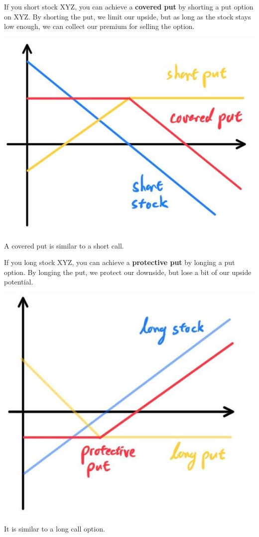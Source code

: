 \documentclass{article}
\begin{document}
\begin{definition}
If you short stock XYZ, you can achieve a \textbf{covered put} by shorting a put option on XYZ. By shorting the put, we limit our upside, but as long as the stock stays low enough, we can collect our premium for selling the option. 
\begin{center}
    \includegraphics[scale=0.3]{img/covered_put.jpg}
\end{center}
A covered put is similar to a short call. 
\end{definition}

\begin{definition}
If you long stock XYZ, you can achieve a \textbf{protective put} by longing a put option. By longing the put, we protect our downside, but lose a bit of our upside potential. 
\begin{center}
    \includegraphics[scale=0.3]{img/protective_put.jpg}
\end{center}
It is similar to a long call option. 
\end{definition}
\end{document}
